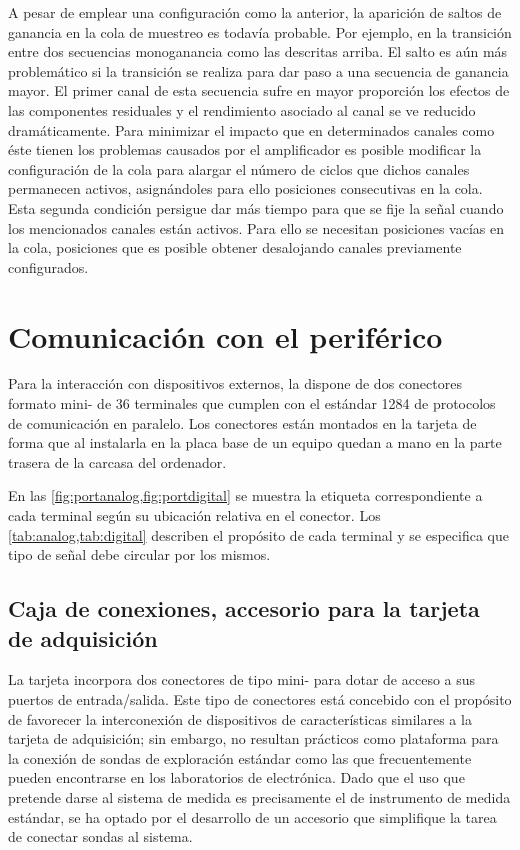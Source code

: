 A pesar de emplear una configuración como la anterior, la aparición de
saltos de ganancia en la cola de muestreo es todavía probable. Por ejemplo,
en la transición entre dos secuencias monoganancia como las descritas
arriba. El salto es aún más problemático si la transición se realiza para
dar paso a una secuencia de ganancia mayor. El primer canal de esta
secuencia sufre en mayor proporción los efectos de las componentes
residuales y el rendimiento asociado al canal se ve reducido
dramáticamente. Para minimizar el impacto que en determinados canales como
éste tienen los problemas causados por el amplificador es posible modificar
la configuración de la cola para alargar el número de ciclos que dichos
canales permanecen activos, asignándoles para ello posiciones consecutivas
en la cola. Esta segunda condición persigue dar más tiempo para que se fije
la señal cuando los mencionados canales están activos. Para ello se
necesitan posiciones vacías en la cola, posiciones que es posible obtener
desalojando canales previamente configurados.


\section{Comunicación con el periférico}

Para la interacción con dispositivos externos, la \kpci{} dispone de dos
conectores formato mini- de 36 terminales que cumplen con el
estándar  1284 de protocolos de comunicación en paralelo. Los
conectores están montados en la tarjeta de forma que al instalarla en la
placa base de un equipo quedan a mano en la parte trasera de la carcasa del
ordenador.

En las \cref{fig:portanalog,fig:portdigital} se muestra la etiqueta
correspondiente a cada terminal según su ubicación relativa en el conector.
Los \cref{tab:analog,tab:digital} describen el propósito de cada terminal y
se especifica que tipo de señal debe circular por los mismos.


\subsection{Caja de conexiones, accesorio para la tarjeta de
adquisición}\label{subsec:conbox}

La tarjeta \kpci{} incorpora dos conectores de tipo mini- para dotar
de acceso a sus puertos de entrada/salida. Este tipo de conectores está
concebido con el propósito de favorecer la interconexión de dispositivos de
características similares a la tarjeta de adquisición; sin embargo, no
resultan prácticos como plataforma para la conexión de sondas de
exploración estándar como las que frecuentemente pueden encontrarse en los
laboratorios de electrónica. Dado que el uso que pretende darse al sistema
de medida es precisamente el de instrumento de medida estándar, se ha
optado por el desarrollo de un accesorio que simplifique la tarea de
conectar sondas al sistema.

